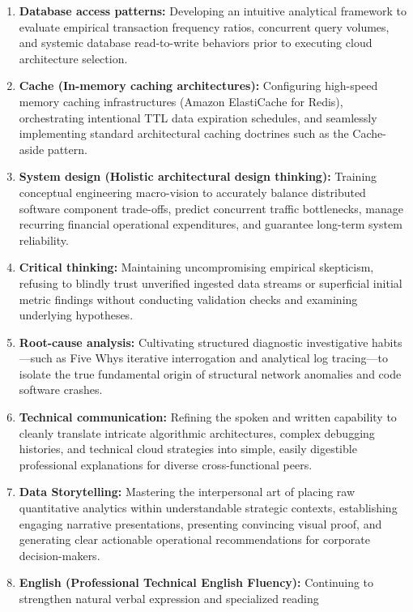 \begin{enumerate}
  NAT gateways, and erecting impenetrable network firewalls around
  sensitive persistence databases.
\item
  \textbf{Database access patterns:} Developing an intuitive analytical
  framework to evaluate empirical transaction frequency ratios,
  concurrent query volumes, and systemic database read-to-write
  behaviors prior to executing cloud architecture selection.
\item
  \textbf{Cache (In-memory caching architectures):} Configuring
  high-speed memory caching infrastructures (Amazon ElastiCache for
  Redis), orchestrating intentional TTL data expiration schedules, and
  seamlessly implementing standard architectural caching doctrines such
  as the Cache-aside pattern.
\item
  \textbf{System design (Holistic architectural design thinking):}
  Training conceptual engineering macro-vision to accurately balance
  distributed software component trade-offs, predict concurrent traffic
  bottlenecks, manage recurring financial operational expenditures, and
  guarantee long-term system reliability.
\item
  \textbf{Critical thinking:} Maintaining uncompromising empirical
  skepticism, refusing to blindly trust unverified ingested data streams
  or superficial initial metric findings without conducting validation
  checks and examining underlying hypotheses.
\item
  \textbf{Root-cause analysis:} Cultivating structured diagnostic
  investigative habits---such as Five Whys iterative interrogation and
  analytical log tracing---to isolate the true fundamental origin of
  structural network anomalies and code software crashes.
\item
  \textbf{Technical communication:} Refining the spoken and written
  capability to cleanly translate intricate algorithmic architectures,
  complex debugging histories, and technical cloud strategies into
  simple, easily digestible professional explanations for diverse
  cross-functional peers.
\item
  \textbf{Data Storytelling:} Mastering the interpersonal art of placing
  raw quantitative analytics within understandable strategic contexts,
  establishing engaging narrative presentations, presenting convincing
  visual proof, and generating clear actionable operational
  recommendations for corporate decision-makers.
\item
  \textbf{English (Professional Technical English Fluency):} Continuing
  to strengthen natural verbal expression and specialized reading

\end{enumerate}
